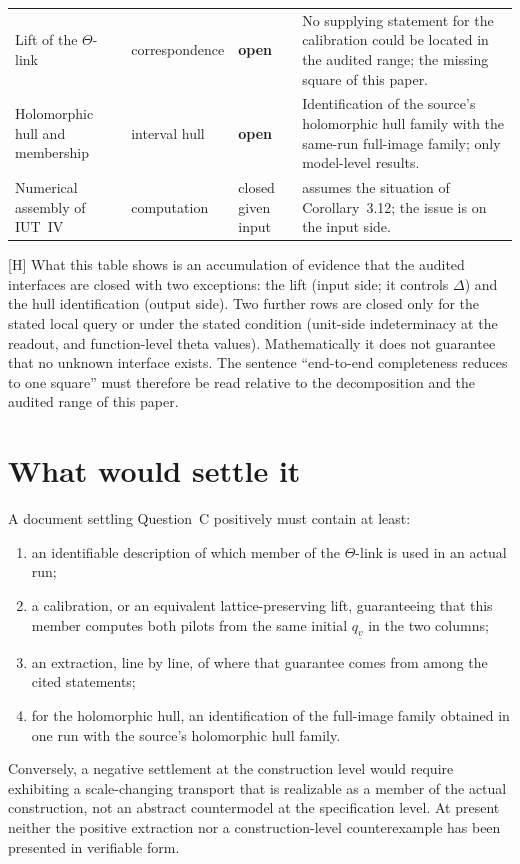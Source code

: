 \documentclass[11pt]{article}
\theoremstyle{plain}
\theoremstyle{definition}
\theoremstyle{remark}
\newcommand{\Hmark}{\textup{[H]}}
\begin{document}
\begin{center}
\begin{longtable}{>{\raggedright\arraybackslash}p{2.9cm}>{\raggedright\arraybackslash}p{2.0cm}>{\raggedright\arraybackslash}p{1.9cm}>{\raggedright\arraybackslash}p{6.2cm}}
Lift of the $\Theta$-link & correspondence & \textbf{open} & No
supplying statement for the calibration could be located in the
audited range; the missing square of this paper.\\
Holomorphic hull and membership & interval hull & \textbf{open} &
Identification of the source's holomorphic hull family with the
same-run full-image family; only model-level results.\\
Numerical assembly of IUT~IV & computation & closed given input &
\cite[Thm.~1.10]{IUT4} assumes the situation of Corollary~3.12; the
issue is on the input side.\\
\bottomrule
\end{longtable}
\end{center}

\Hmark{} What this table shows is an accumulation of evidence that
the audited interfaces are closed with two exceptions: the lift
(input side; it controls $\Delta$) and the hull identification
(output side).  Two further rows are closed only for the stated
local query or under the stated condition (unit-side indeterminacy
at the readout, and function-level theta values).
Mathematically it does not guarantee that no unknown interface
exists.  The sentence ``end-to-end completeness reduces to one
square'' must therefore be read relative to the decomposition and
the audited range of this paper.

\section{What would settle it}

A document settling Question~C positively must contain at least:
\begin{enumerate}[label=\textup{(\arabic*)}]
\item an identifiable description of which member of the
$\Theta$-link is used in an actual run;
\item a calibration, or an equivalent lattice-preserving lift,
guaranteeing that this member computes both pilots from the same
initial $q_{\underline v}$ in the two columns;
\item an extraction, line by line, of where that guarantee comes
from among the cited statements;
\item for the holomorphic hull, an identification of the full-image
family obtained in one run with the source's holomorphic hull
family.
\end{enumerate}
Conversely, a negative settlement at the construction level would
require exhibiting a scale-changing transport that is realizable as
a member of the actual construction, not an abstract countermodel
at the specification level.  At present neither the positive
extraction nor a construction-level counterexample has been
presented in verifiable form.
\end{document}
